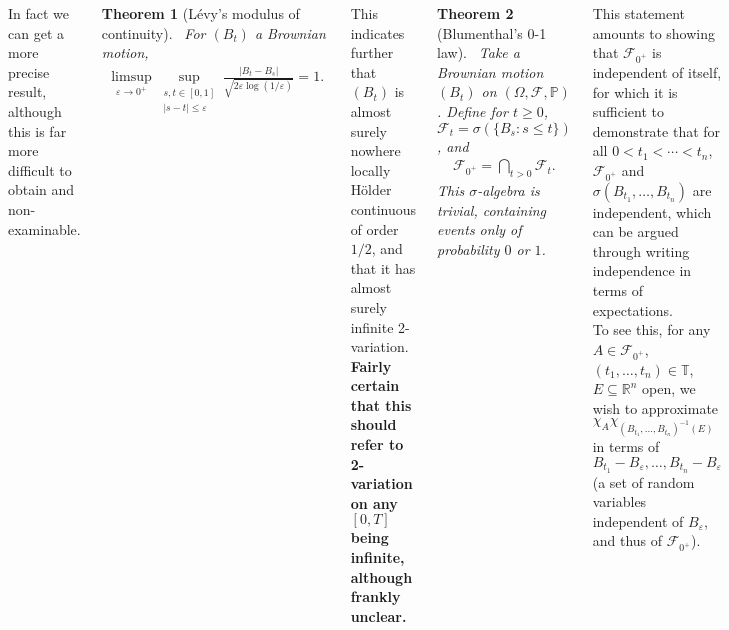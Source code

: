 \documentclass{tikzposter} %
\newtheorem{theorem}{Theorem}
\begin{document}
\begin{columns}
{    In fact we can get a more precise result, although this is far more difficult to obtain and non-examinable. \\

    \begin{theorem}[L\'evy's modulus of continuity]
      \ For $(B_{t})$ a Brownian motion,
      \begin{align*}
        \limsup_{\varepsilon \to 0^{+}} \sup_{\substack{s,t \in [0,1] \\ |s-t| \le \varepsilon}} \frac{|B_{t}-B_{s}|}{\sqrt{2\varepsilon \log(1/\varepsilon)}} = 1.
      \end{align*}
    \end{theorem}
    \hphantom{}

    This indicates further that $(B_{t})$ is almost surely nowhere locally H\"older continuous of order $1/2$, and that it has almost surely infinite 2-variation. \\

    \textbf{Fairly certain that this should refer to 2-variation on any $[0,T]$ being infinite, although frankly unclear.} \\

    \begin{theorem}[Blumenthal's 0-1 law]
    \ Take a Brownian motion $(B_{t})$ on $(\Omega, \mathcal{F}, \mathbb{P})$. Define for $t \ge 0$, $\mathcal{F}_{t} = \sigma(\{B_{s} : s \le t\})$, and
    \begin{align*}
      \mathcal{F}_{0^{+}} = \bigcap_{t > 0} \mathcal{F}_{t}.
    \end{align*}
    This $\sigma$-algebra is trivial, containing events only of probability $0$ or $1$.
    \end{theorem}
    \hphantom{}

    This statement amounts to showing that $\mathcal{F}_{0^{+}}$ is independent of itself, for which it is sufficient to demonstrate that for all $0 < t_{1} < \cdots < t_{n}$, $\mathcal{F}_{0^{+}}$ and $\sigma(B_{t_{1}},\dots,B_{t_{n}})$ are independent, which can be argued through writing independence in terms of expectations. \\

    To see this, for any $A \in \mathcal{F}_{0^{+}}$, $(t_{1},\dots,t_{n}) \in \mathbb{T}$, $E \subseteq \mathbb{R}^{n}$ open, we wish to approximate $\chi_{A}\chi_{(B_{t_{1}},\dots,B_{t_{n}})^{-1}(E)}$ in terms of $B_{t_{1}}-B_{\varepsilon},\dots,B_{t_{n}}-B_{\varepsilon}$ (a set of random variables independent of $B_\varepsilon$, and thus of $\mathcal{F}_{0^{+}}$). \\

}
\end{columns}
\end{document}
